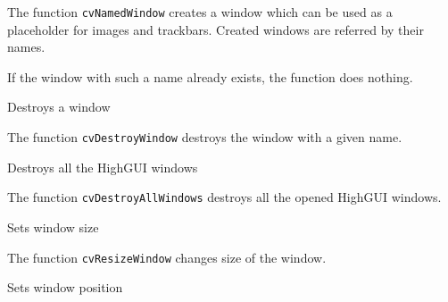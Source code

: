 The function \texttt{cvNamedWindow} creates a window which can be used as a placeholder for images and trackbars. Created windows are referred by their names.

If the window with such a name already exists, the function does nothing.


Destroys a window


\begin{description}
\end{description}

The function \texttt{cvDestroyWindow} destroys the window with a given name.


Destroys all the HighGUI windows


The function \texttt{cvDestroyAllWindows} destroys all the opened HighGUI windows.


Sets window size


\begin{description}
\end{description}

The function \texttt{cvResizeWindow} changes size of the window.


Sets window position


\begin{description}
\end{description}

